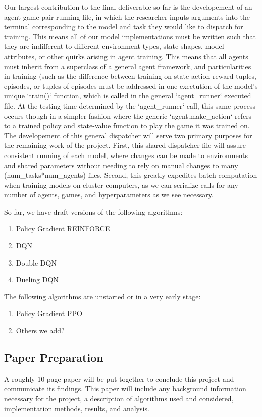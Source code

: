 \documentclass[conference]{IEEEtran}
\begin{document}
Our largest contribution to the final deliverable so far is the developement of an agent-game pair running file, in which the researcher inputs arguments into the terminal corresponding to the model and task they would like to dispatch for training. This means all of our model implementations must be written such that they are indifferent to different environment types, state shapes, model attributes, or other quirks arising in agent training. This means that all agents must inherit from a superclass of a general agent framework, and particularities in training (such as the difference between training on state-action-reward tuples, episodes, or tuples of episodes must be addressed in one exectution of the model's unique `train()` function, which is called in the general `agent_runner` executed file.
At the testing time determined by the `agent_runner` call, this same process occurs though in a simpler fashion where the generic `agent.make_action` refers to a trained policy and state-value function to play the game it was trained on.
The developement of this general dispatcher will serve two primary purposes for the remaining work of the project. First, this shared dispatcher file will assure consistent running of each model, where changes can be made to environments and shared parameters without needing to rely on manual changes to many (num_tasks*num_agents) files. Second, this greatly expedites batch computation when training models on cluster computers, as we can serialize calls for any number of agents, games, and hyperparameters as we see necessary.

So far, we have draft versions of the following algorithms:
\begin{enumerate}
\item Policy Gradient REINFORCE
\item DQN
\item Double DQN
\item Dueling DQN
\end{enumerate}

The following algorithms are unstarted or in a very early stage:
\begin{enumerate}
\item Policy Gradient PPO
\item Others we add?
\end{enumerate}

\subsection{Paper Preparation}
A roughly 10 page paper will be put together to conclude this project and communicate its findings.
This paper will include any background information necessary for the project, a description of algorithms used and considered, implementation methods, results, and analysis.
\end{document}
